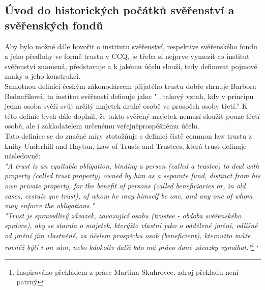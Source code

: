 \documentclass{article}
\begin{document}
\newpage

\subsection{Úvod do historických počátků svěřenství a svěřenských fondů}

\indent Aby bylo možné dále hovořit o institutu svěřenství, respektive svěřenského fondu a jeho předlohy ve formě trustu v CCQ, je třeba si nejprve vymezit co institut svěřenství znamená, představuje a k jakému účelu slouží, tedy definovat pojmové znaky a jeho konstrukci.\\

Samotnou definici českým zákonodárcem přijatého trustu dobře shrnuje Barbora Bednaříková, ta institut svěřenstí definuje jako: "...takový vztah, kdy v principu jedna osoba svěří svůj určitý majetek druhé osobě ve prospěch osoby třetí." K této definic bych dále doplnil, že takto svěřený majetek nemusí sloužit pouze třetí osobě, ale i zakladatelem určenému veřejněprospěšnému účelu.\\

Tato definice se do značné míry ztotožňuje s definicí čistě common law trustu z knihy Underhill and Hayton, Law of Trusts and Trustees, která trust definuje následovně:\\ %

\textit{"A trust is an equitable obligation, binding a person (called a trustee) to deal with property (called trust property) owned by him as a separate fund, distinct from his own private property, for the benefit of persons (called beneficiaries or, in old cases, cestuis que trust), of whom he may himself be one, and any one of whom may enforce the obligations."} \\

\textit{"Trust je spravedlivý závazek, zavazující osobu (trustee - obdoba svěřenského správce), aby se starala o majetek, kterýžto vlastní jako o oddělené jmění, odlišné od jmění jím vlastněné, za účelem prospěchu osob (beneficient), kteroužto může rovněž býti i on sám, nebo kdokoliv další kdo má právo dané závazky vymáhat."}\footnote{Inspirováno překladem z práce Martina Skuhrovce, zdroj překladu není patrný} \textsuperscript{,}   \\
\end{document}
